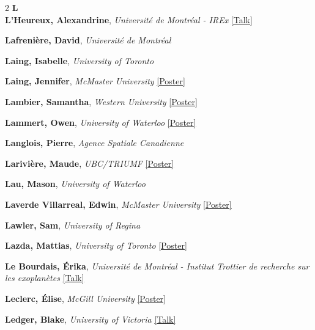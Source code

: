 \begin{small}
\begin{multicols}{2}
{\sffamily\bfseries\color{cascablue}\large L}\\[2pt]

\textbf{L'Heureux, Alexandrine}, {\footnotesize\textit{Université de Montréal - IREx}} \hyperref[abstract-page-talk-167]{\scriptsize\textcolor{cascablue}{[Talk]}}\par
\textbf{Lafrenière, David}, {\footnotesize\textit{Université de Montréal}}\par
\textbf{Laing, Isabelle}, {\footnotesize\textit{University of Toronto}}\par
\textbf{Laing, Jennifer}, {\footnotesize\textit{McMaster University}} \hyperref[poster-abstract-page-talk-197]{\scriptsize\textcolor{cascateal}{[Poster]}}\par
\textbf{Lambier, Samantha}, {\footnotesize\textit{Western University}} \hyperref[poster-abstract-page-talk-79]{\scriptsize\textcolor{cascateal}{[Poster]}}\par
\textbf{Lammert, Owen}, {\footnotesize\textit{University of Waterloo}} \hyperref[poster-abstract-page-talk-232]{\scriptsize\textcolor{cascateal}{[Poster]}}\par
\textbf{Langlois, Pierre}, {\footnotesize\textit{Agence Spatiale Canadienne}}\par
\textbf{Larivière, Maude}, {\footnotesize\textit{UBC/TRIUMF}} \hyperref[poster-abstract-page-talk-324]{\scriptsize\textcolor{cascateal}{[Poster]}}\par
\textbf{Lau, Mason}, {\footnotesize\textit{University of Waterloo}}\par
\textbf{Laverde Villarreal, Edwin}, {\footnotesize\textit{McMaster University}} \hyperref[poster-abstract-page-talk-65]{\scriptsize\textcolor{cascateal}{[Poster]}}\par
\textbf{Lawler, Sam}, {\footnotesize\textit{University of Regina}}\par
\textbf{Lazda, Mattias}, {\footnotesize\textit{University of Toronto}} \hyperref[poster-abstract-page-talk-191]{\scriptsize\textcolor{cascateal}{[Poster]}}\par
\textbf{Le Bourdais, Érika}, {\footnotesize\textit{Université de Montréal - Institut Trottier de recherche sur les exoplanètes}} \hyperref[abstract-page-talk-26]{\scriptsize\textcolor{cascablue}{[Talk]}}\par
\textbf{Leclerc, Élise}, {\footnotesize\textit{McGill University}} \hyperref[poster-abstract-page-talk-299]{\scriptsize\textcolor{cascateal}{[Poster]}}\par
\textbf{Ledger, Blake}, {\footnotesize\textit{University of Victoria}} \hyperref[abstract-page-talk-222]{\scriptsize\textcolor{cascablue}{[Talk]}}\par

\end{multicols}
\end{small}
